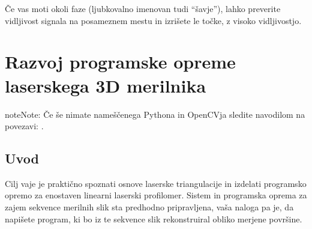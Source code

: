 \documentclass[letterpaper,10pt,english]{sphinxmanual}
\begin{document}
\sphinxAtStartPar
Če vas moti  okoli faze (ljubkovalno imenovan tudi “šavje”), lahko preverite vidljivost signala na posameznem mestu in izrišete le točke, z visoko vidljivostjo.

\begin{sphinxVerbatim}[commandchars=\\\{\},numbers=left,firstnumber=1,stepnumber=1]

  
  



 
\end{sphinxVerbatim}


\chapter{Razvoj programske opreme laserskega 3D merilnika}
\label{\detokenize{laserskiprofilomer:razvoj-programske-opreme-laserskega-3d-merilnika}}\label{\detokenize{laserskiprofilomer:laserskiprofilomer}}\label{\detokenize{laserskiprofilomer::doc}}
\begin{sphinxadmonition}{note}{Note:}
\sphinxAtStartPar
Če še nimate nameščenega Pythona in OpenCVja sledite navodilom na povezavi: .
\end{sphinxadmonition}


\section{Uvod}
\label{\detokenize{laserskiprofilomer:uvod}}
\sphinxAtStartPar
Cilj vaje je praktično spoznati osnove laserske triangulacije in izdelati programsko opremo za enostaven linearni laserski profilomer. Sistem in programska oprema za zajem sekvence merilnih slik sta predhodno pripravljena, vaša naloga pa je, da napišete program, ki bo iz te sekvence slik rekonstruiral obliko merjene površine.
\end{document}
